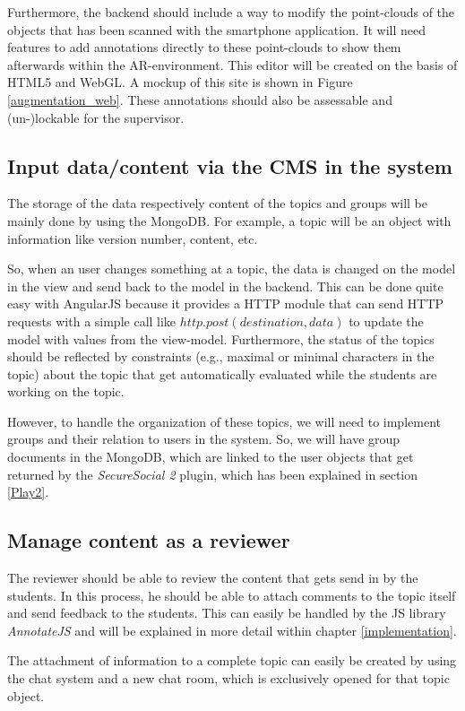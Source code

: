 Furthermore, the backend should include a way to modify the point-clouds of the objects that has been scanned with the smartphone application. It will need features to add annotations directly to these point-clouds to show them afterwards within the \ac{AR}-environment. This editor will be created on the basis of \ac{HTML5} and \ac{WebGL}. A mockup of this site is shown in Figure \ref{augmentation_web}. These annotations should also be assessable and (un-)lockable for the supervisor. 

\subsection{Input data/content via the \ac{CMS} in the system}
The storage of the data respectively content of the topics and groups will be mainly done by using the MongoDB. For example, a topic will be an object with information like version number, content, etc. 

So, when an user changes something at a topic, the data is changed on the model in the view and send back to the model in the backend. This can be done quite easy with AngularJS because it provides a \ac{HTTP} module that can send \ac{HTTP} requests with a simple call like $http.post(destination,data)$ to update the model with values from the view-model. Furthermore, the status of the topics should be reflected by constraints (e.g., maximal or minimal characters in the topic) about the topic that get automatically evaluated while the students are working on the topic. 

However, to handle the organization of these topics, we will need to implement groups and their relation to users in the system. So, we will have group documents in the MongoDB, which are linked to the user objects that get returned by the \emph{SecureSocial 2} plugin, which has been explained in section \ref{Play2}.

\subsection{Manage content as a reviewer}
The reviewer should be able to review the content that gets send in by the students. In this process, he should be able to attach comments to the topic itself and send feedback to the students. This can easily be handled by the \ac{JS} library \emph{AnnotateJS} and will be explained in more detail within chapter \ref{implementation}.

The attachment of information to a complete topic can easily be created by using the chat system and a new chat room, which is exclusively opened for that topic object. 

